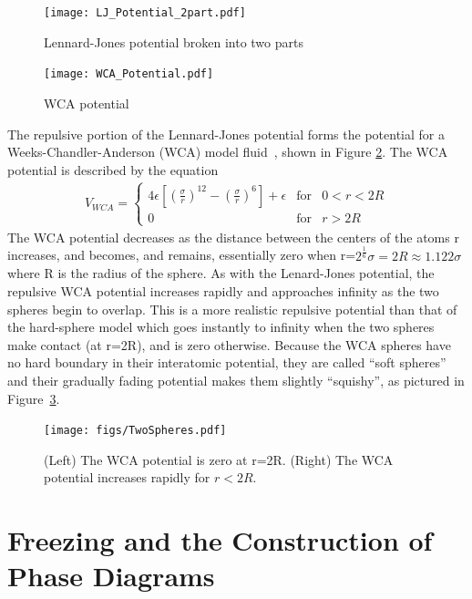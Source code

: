 \documentclass[double,12pt]{beavtex}
\begin{document}
\begin{figure}
    \centering
    \texttt{[image: LJ\_Potential\_2part.pdf]}
    \caption{Lennard-Jones potential broken into two parts}
    \label{fig:LJ_potential_2parts}
  \end{figure}

\begin{figure}
    \centering
    \texttt{[image: WCA\_Potential.pdf]}
    \caption{WCA potential}
    \label{fig:WCA_potential}
  \end{figure}

The repulsive portion of the Lennard-Jones potential forms the potential for a 
Weeks-Chandler-Anderson (WCA) model fluid~\cite{andersen1971relationship},
shown in Figure \ref{fig:WCA_potential}. 
The WCA potential is described by the equation 
\begin{align} \label{eq:VWCA}
    V_{WCA}=\left\{\begin{array}{rcl} {4\epsilon{\left[\left(\frac{\sigma}{r}\right)^{12} - \left(\frac{\sigma}{r}\right)^6 \right]}+\epsilon} & \mbox{for} & 0<r<{2R} \\ 0 & \mbox{for} & r>2R \end{array}\right.
\end{align} 
The WCA potential decreases as the distance between the 
centers of the atoms r increases, and becomes, and remains, essentially 
zero when r=$2^\frac{1}{6}\sigma=2R\approx{1.122}\sigma$ where R is the 
radius of the sphere. 
As with the Lenard-Jones potential, the repulsive WCA potential increases 
rapidly and approaches infinity as the two spheres begin to overlap. This 
is a more realistic repulsive potential than that of the hard-sphere model 
which goes instantly to infinity when the two spheres make contact (at r=2R), 
and is zero otherwise. Because the WCA spheres have no hard boundary in 
their interatomic potential, they are called ``soft spheres'' and their 
gradually fading potential makes them slightly ``squishy'', as pictured in
Figure~\ref{fig:TwoSpheres}.

\begin{figure}
    \centering
    \texttt{[image: figs/TwoSpheres.pdf]} 
    \caption{(Left) The WCA potential is zero at r=2R. 
             (Right) The WCA potential increases rapidly for $r<2R$.}
    \label{fig:TwoSpheres}
\end{figure} 
    
\section{Freezing and the Construction of Phase Diagrams}
\end{document}
